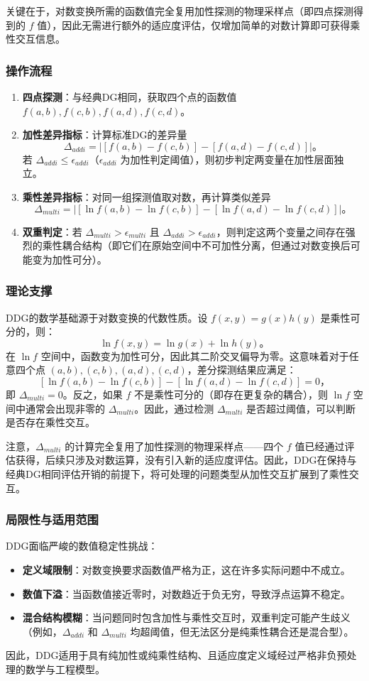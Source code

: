 关键在于，对数变换所需的函数值完全复用加性探测的物理采样点（即四点探测得到的 $f$ 值），因此无需进行额外的适应度评估，仅增加简单的对数计算即可获得乘性交互信息。

\subsubsection{操作流程}
\begin{enumerate}
    \item \textbf{四点探测}：与经典DG相同，获取四个点的函数值 $f(a,b), f(c,b), f(a,d), f(c,d)$。
    \item \textbf{加性差异指标}：计算标准DG的差异量
        $$\Delta_{addi} = | [f(a,b) - f(c,b)] - [f(a,d) - f(c,d)] |。$$
        若 $\Delta_{addi} \leq \epsilon_{addi}$（$\epsilon_{addi}$ 为加性判定阈值），则初步判定两变量在加性层面独立。
    \item \textbf{乘性差异指标}：对同一组探测值取对数，再计算类似差异
        $$\Delta_{multi} = | [\ln f(a,b) - \ln f(c,b)] - [\ln f(a,d) - \ln f(c,d)] |。$$
    \item \textbf{双重判定}：若 $\Delta_{multi} > \epsilon_{multi}$ 且 $\Delta_{addi} > \epsilon_{addi}$，则判定这两个变量之间存在强烈的乘性耦合结构（即它们在原始空间中不可加性分离，但通过对数变换后可能变为加性可分）。
\end{enumerate}

\subsubsection{理论支撑}
DDG的数学基础源于对数变换的代数性质。设 $f(x,y)=g(x)h(y)$ 是乘性可分的，则：
\[
\ln f(x,y) = \ln g(x) + \ln h(y)。
\]
在 $\ln f$ 空间中，函数变为加性可分，因此其二阶交叉偏导为零。这意味着对于任意四个点 $(a,b), (c,b), (a,d), (c,d)$，差分探测结果应满足：
\[
[\ln f(a,b) - \ln f(c,b)] - [\ln f(a,d) - \ln f(c,d)] = 0，
\]
即 $\Delta_{multi}=0$。反之，如果 $f$ 不是乘性可分的（即存在更复杂的耦合），则 $\ln f$ 空间中通常会出现非零的 $\Delta_{multi}$。因此，通过检测 $\Delta_{multi}$ 是否超过阈值，可以判断是否存在乘性交互。

注意，$\Delta_{multi}$ 的计算完全复用了加性探测的物理采样点——四个 $f$ 值已经通过评估获得，后续只涉及对数运算，没有引入新的适应度评估。因此，DDG在保持与经典DG相同评估开销的前提下，将可处理的问题类型从加性交互扩展到了乘性交互。

\subsubsection{局限性与适用范围}
DDG面临严峻的数值稳定性挑战：
\begin{itemize}
    \item \textbf{定义域限制}：对数变换要求函数值严格为正，这在许多实际问题中不成立。
    \item \textbf{数值下溢}：当函数值接近零时，对数趋近于负无穷，导致浮点运算不稳定。
    \item \textbf{混合结构模糊}：当问题同时包含加性与乘性交互时，双重判定可能产生歧义（例如，$\Delta_{addi}$ 和 $\Delta_{multi}$ 均超阈值，但无法区分是纯乘性耦合还是混合型）。
\end{itemize}
因此，DDG适用于具有纯加性或纯乘性结构、且适应度定义域经过严格非负预处理的数学与工程模型。

